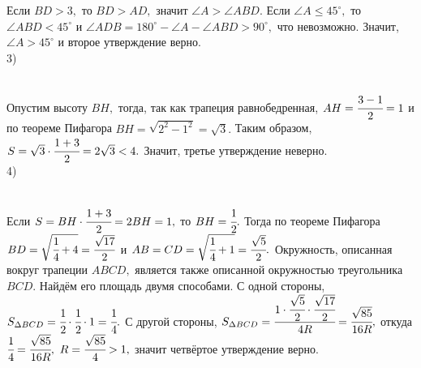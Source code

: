\documentclass[12pt]{article}
\begin{document}
Если $BD>3,$ то $BD>AD,$ значит $\angle A>\angle ABD.$ Если $\angle A\leqslant 45^\circ,$ то $\angle ABD<45^\circ$ и $\angle ADB=180^\circ-\angle A-\angle ABD>90^\circ,$ что невозможно. Значит, $\angle A>45^\circ$ и второе утверждение верно.\\
3) \begin{figure}[ht!]
\end{figure}\\
Опустим высоту $BH,$ тогда, так как трапеция равнобедренная, $AH=\cfrac{3-1}{2}=1$ и по теореме Пифагора $BH=\sqrt{2^2-1^2}=\sqrt{3}.$ Таким образом, $S=\sqrt{3}\cdot\cfrac{1+3}{2}=2\sqrt{3}<4.$ Значит, третье утверждение неверно.\\
4) \begin{figure}[ht!]
\end{figure}\\
Если $S=BH\cdot\cfrac{1+3}{2}=2BH=1,$ то $BH=\cfrac{1}{2}.$ Тогда по теореме Пифагора $BD=\sqrt{\cfrac{1}{4}+4}=\cfrac{\sqrt{17}}{2}$ и $AB=CD=\sqrt{\cfrac{1}{4}+1}=\cfrac{\sqrt{5}}{2}.$ Окружность, описанная вокруг трапеции $ABCD,$ является также описанной окружностью треугольника $BCD.$ Найдём его площадь двумя способами. С одной стороны, $S_{\Delta BCD}=\cfrac{1}{2}\cdot\cfrac{1}{2}\cdot1=\cfrac{1}{4}.$ С другой стороны, $S_{\Delta BCD}=\cfrac{1\cdot\cfrac{\sqrt{5}}{2}\cdot\cfrac{\sqrt{17}}{2}}{4R}=\cfrac{\sqrt{85}}{16R},$ откуда $\cfrac{1}{4}=\cfrac{\sqrt{85}}{16R},\ R=\cfrac{\sqrt{85}}{4}>1,$ значит четвёртое утверждение верно.\\
\end{document}
